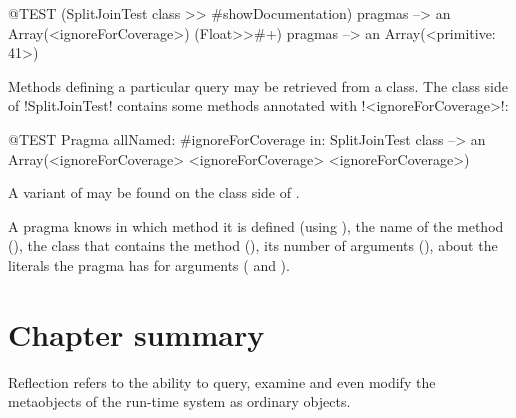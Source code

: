\documentclass[a4paper,10pt,twoside]{book}
\begin{document}
{\begin{code}{@TEST}
(SplitJoinTest class >> #showDocumentation) pragmas
  --> an Array(<ignoreForCoverage>)
(Float>>#+) pragmas --> an Array(<primitive: 41>)
\end{code}

Methods defining a particular query may be retrieved from a class. The class side of \ct!SplitJoinTest! contains some methods annotated with \ct!<ignoreForCoverage>!:

\begin{code}{@TEST}
Pragma allNamed: #ignoreForCoverage in: SplitJoinTest class  --> an Array(<ignoreForCoverage> <ignoreForCoverage> <ignoreForCoverage>)
\end{code}

A variant of  may be found on the class side of .

A pragma knows in which method it is defined (using ), the name of the method (), the class that contains the method (), its number of arguments (), about the literals the pragma has for arguments ( and ).


\section{Chapter summary}

Reflection refers to the ability to query, examine and even modify the metaobjects of the run-time system as ordinary objects.

}
\end{document}
